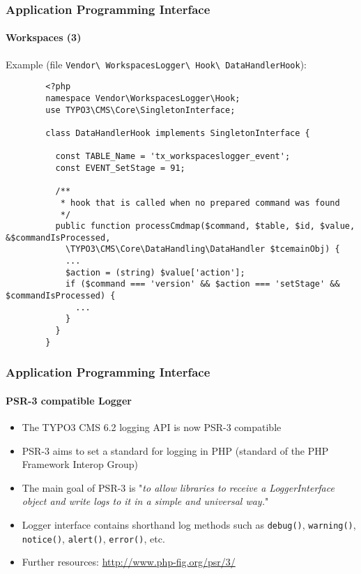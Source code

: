 
\begin{frame}[fragile]
	\frametitle{Application Programming Interface}
	\framesubtitle{Workspaces (3)}

	Example (file \texttt{Vendor\textbackslash
		WorkspacesLogger\textbackslash
		Hook\textbackslash
		DataHandlerHook}):

	\lstset{
		basicstyle=\tiny\ttfamily
	}

	\begin{lstlisting}
		<?php
		namespace Vendor\WorkspacesLogger\Hook;
		use TYPO3\CMS\Core\SingletonInterface;

		class DataHandlerHook implements SingletonInterface {

		  const TABLE_Name = 'tx_workspaceslogger_event';
		  const EVENT_SetStage = 91;

		  /**
		   * hook that is called when no prepared command was found
		   */
		  public function processCmdmap($command, $table, $id, $value, &$commandIsProcessed,
		    \TYPO3\CMS\Core\DataHandling\DataHandler $tcemainObj) {
		    ...
		    $action = (string) $value['action'];
		    if ($command === 'version' && $action === 'setStage' && $commandIsProcessed) {
		      ...
		    }
		  }
		}
	\end{lstlisting}

\end{frame}


\begin{frame}[fragile]
	\frametitle{Application Programming Interface}
	\framesubtitle{PSR-3 compatible Logger}

	\begin{itemize}
		\item The TYPO3 CMS 6.2 logging API is now PSR-3 compatible
		\item PSR-3 aims to set a standard for logging in PHP (standard of the PHP Framework Interop Group)

		\item The main goal of PSR-3 is
			"\emph{to allow libraries to receive a LoggerInterface object and write logs to it in a simple and universal way.}"

		\item Logger interface contains shorthand log methods such as\newline
			\texttt{debug()}, \texttt{warning()}, \texttt{notice()}, \texttt{alert()}, \texttt{error()}, etc.

		\item Further resources:\newline
			\url{http://www.php-fig.org/psr/3/}

	\end{itemize}

\end{frame}

